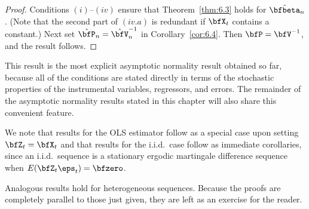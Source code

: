 \begin{proof}
Conditions $(i)$--$(iv)$ ensure that Theorem~\ref{thm:6.3} holds for $\tilde{\bfbeta}_n$. (Note that the second part of $(iv.a)$ is redundant if $\bfX_t$ contains a constant.) Next set $\hat{\bfP}_n = \hat{\bfV}_n^{-1}$ in Corollary~\ref{cor:6.4}. Then $\bfP = \bfV^{-1}$, and the result follows.
\end{proof}

This result is the most explicit asymptotic normality result obtained so far, because all of the conditions are stated directly in terms of the stochastic properties of the instrumental variables, regressors, and errors. The remainder of the asymptotic normality results stated in this chapter will also share this convenient feature.

We note that results for the OLS estimator follow as a special case upon setting $\bfZ_t = \bfX_t$ and that results for the i.i.d.\ case follow as immediate corollaries, since an i.i.d.\ sequence is a stationary ergodic martingale difference sequence when $E(\bfZ_t\eps_t) = \bfzero$.

Analogous results hold for heterogeneous sequences. Because the proofs are completely parallel to those just given, they are left as an exercise for the reader.


